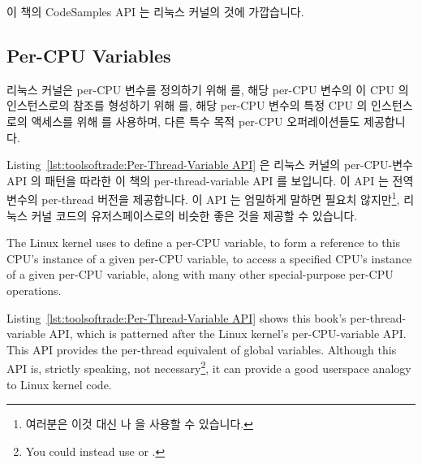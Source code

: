 이 책의 CodeSamples API 는 리눅스 커널의 것에 가깝습니다.

\subsection{Per-CPU Variables}
\label{sec:toolsoftrade:Per-CPU Variables}

리눅스 커널은 per-CPU 변수를 정의하기 위해  를, 해당
per-CPU 변수의 이 CPU 의 인스턴스로의 참조를 형성하기 위해 
를, 해당 per-CPU 변수의 특정 CPU 의 인스턴스로의 액세스를 위해 
를 사용하며, 다른 특수 목적 per-CPU 오퍼레이션들도 제공합니다.

Listing~\ref{lst:toolsoftrade:Per-Thread-Variable API} 은
리눅스 커널의 per-CPU-변수 API 의 패턴을 따라한 이 책의 per-thread-variable API
를 보입니다.
이 API 는 전역 변수의 per-thread 버전을 제공합니다.
이 API 는 엄밀하게 말하면 필요치 않지만\footnote{
	여러분은 이것 대신  나  을 사용할 수
	있습니다.},
리눅스 커널 코드의 유저스페이스로의 비슷한 좋은 것을 제공할 수 있습니다.

\iffalse

The Linux kernel uses  to define a per-CPU variable,
 to form a reference to this CPU's instance of a
given per-CPU variable,  to access a specified CPU's
instance of a given per-CPU variable, along with many other special-purpose
per-CPU operations.

Listing~\ref{lst:toolsoftrade:Per-Thread-Variable API}
shows this book's per-thread-variable API, which is patterned
after the Linux kernel's per-CPU-variable API\@.
This API provides the per-thread equivalent of global variables.
Although this API is, strictly speaking, not necessary\footnote{
	You could instead use  or .},
it can provide a good userspace analogy to Linux kernel code.

